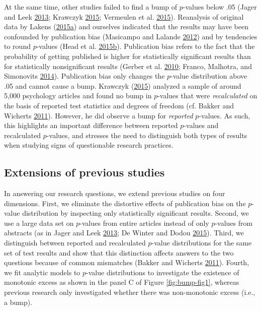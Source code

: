 \documentclass[a5paper]{book}
\begin{document}
At the same time, other studies failed to find a bump of \(p\)-values
below .05 (Jager and Leek
\protect\hyperlink{ref-doi:10.1093ux2fbiostatisticsux2fkxt007}{2013};
Krawczyk
\protect\hyperlink{ref-doi:10.1371ux2fjournal.pone.0127872}{2015};
Vermeulen et al.
\protect\hyperlink{ref-doi:10.1080ux2f19312458.2015.1096333}{2015}).
Reanalysis of original data by Lakens
(\protect\hyperlink{ref-doi:10.1080ux2f17470218.2014.982664}{2015}\protect\hyperlink{ref-doi:10.1080ux2f17470218.2014.982664}{a})
and ourselves indicated that the results may have been confounded by
publication bias (Masicampo and Lalande
\protect\hyperlink{ref-doi:10.1080ux2f17470218.2012.711335}{2012}) and
by tendencies to round \(p\)-values (Head et al.
\protect\hyperlink{ref-doi:10.1371ux2fjournal.pbio.1002106}{2015}\protect\hyperlink{ref-doi:10.1371ux2fjournal.pbio.1002106}{b}).
Publication bias refers to the fact that the probability of getting
published is higher for statistically significant results than for
statistically nonsignificant results (Gerber et al.
\protect\hyperlink{ref-doi:10.1177ux2f1532673x09350979}{2010}; Franco,
Malhotra, and Simonovits
\protect\hyperlink{ref-doi:10.1126ux2fscience.1255484}{2014}).
Publication bias only changes the \(p\)-value distribution above .05 and
cannot cause a bump. Krawczyk
(\protect\hyperlink{ref-doi:10.1371ux2fjournal.pone.0127872}{2015})
analyzed a sample of around 5,000 psychology articles and found no bump
in \(p\)-values that were \emph{recalculated} on the basis of reported
test statistics and degrees of freedom (cf. Bakker and Wicherts
\protect\hyperlink{ref-doi:10.3758ux2fs13428-011-0089-5}{2011}).
However, he did observe a bump for \emph{reported} \(p\)-values. As
such, this highlights an important difference between reported
\(p\)-values and recalculated \(p\)-values, and stresses the need to
distinguish both types of results when studying signs of questionable
research practices.

\subsection{Extensions of previous
studies}\label{extensions-of-previous-studies}

In answering our research questions, we extend previous studies on four
dimensions. First, we eliminate the distortive effects of publication
bias on the \(p\)-value distribution by inspecting only statistically
significant results. Second, we use a large data set on \(p\)-values
from entire articles instead of only \(p\)-values from abstracts (as in
Jager and Leek
\protect\hyperlink{ref-doi:10.1093ux2fbiostatisticsux2fkxt007}{2013}; De
Winter and Dodou
\protect\hyperlink{ref-doi:10.7717ux2fpeerj.733}{2015}). Third, we
distinguish between reported and recalculated \(p\)-value distributions
for the same set of test results and show that this distinction affects
answers to the two questions because of common mismatches (Bakker and
Wicherts
\protect\hyperlink{ref-doi:10.3758ux2fs13428-011-0089-5}{2011}). Fourth,
we fit analytic models to \(p\)-value distributions to investigate the
existence of monotonic excess as shown in the panel C of Figure
\ref{fig:bump-fig1}, whereas previous research only investigated whether
there was non-monotonic excess (i.e., a bump).
\end{document}
